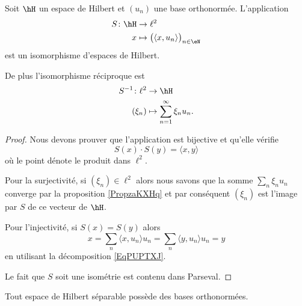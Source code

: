 \begin{corollary}       \label{CorQETwUdF}
    Soit \( \hH\) un espace de Hilbert et \( (u_n)\) une base orthonormée. L'application
    \begin{equation}
        \begin{aligned}
            S\colon \hH&\to \ell^2 \\
            x&\mapsto \big( \langle x, u_n\rangle  \big)_{n\in \eN} 
        \end{aligned}
    \end{equation}
    est un isomorphisme d'espaces de Hilbert.

    De plus l'isomorphisme réciproque est
    \begin{equation}
        \begin{aligned}
            S^{-1}\colon \ell^2&\to \hH \\
            (\xi_n)&\mapsto \sum_{n=1}^{\infty}\xi_nu_n. 
        \end{aligned}
    \end{equation}
\end{corollary}

\begin{proof}
    Nous devons prouver que l'application est bijective et qu'elle vérifie
    \begin{equation}
        S(x)\cdot S(y)=\langle x, y\rangle 
    \end{equation}
    où le point dénote le produit dans \( \ell^2\).

    Pour la surjectivité, si \( (\xi_n)\in \ell^2\) alors nous savons que la somme \( \sum_n\xi_nu_n\) converge par la proposition \ref{PropzaKXHq} et par conséquent \( (\xi_n)\) est l'image par \( S\) de ce vecteur de \( \hH\).

    Pour l'injectivité, si \( S(x)=S(y)\) alors
    \begin{equation}
        x=\sum_n\langle x, u_n\rangle u_n=\sum_n\langle y, u_n\rangle u_n=y
    \end{equation}
    en utilisant la décomposition \eqref{EqPUPTXJ}.

    Le fait que \( S\) soit une isométrie est contenu dans Parseval.
\end{proof}

\begin{proposition}
    Tout espace de Hilbert séparable possède des bases orthonormées.
\end{proposition}

